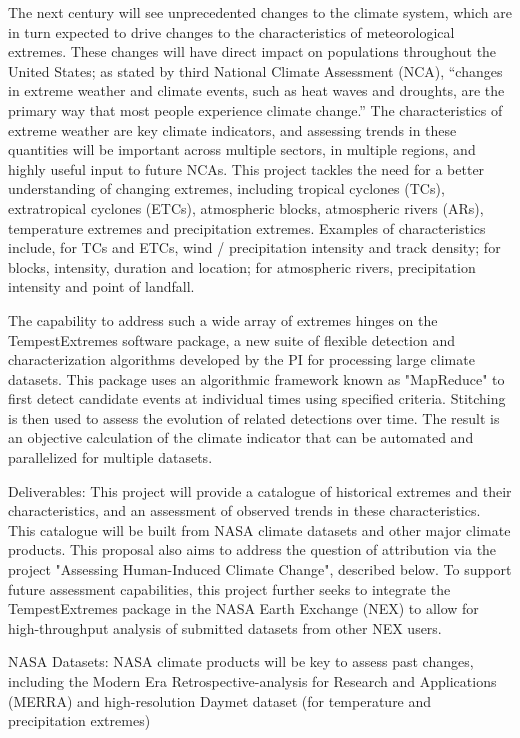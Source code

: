 The next century will see unprecedented changes to the climate system, which are in turn expected to drive changes to the characteristics of meteorological extremes. These changes will have direct impact on populations throughout the United States; as stated by third National Climate Assessment (NCA), ``changes in extreme weather and climate events, such as heat waves and droughts, are the primary way that most people experience climate change.'' The characteristics of extreme weather are key climate indicators, and assessing trends in these quantities will be important across multiple sectors, in multiple regions, and highly useful input to future NCAs. This project tackles the need for a better understanding of changing extremes, including tropical cyclones (TCs), extratropical cyclones (ETCs), atmospheric blocks, atmospheric rivers (ARs), temperature extremes and precipitation extremes. Examples of characteristics include, for TCs and ETCs, wind / precipitation intensity and track density; for blocks, intensity, duration and location; for atmospheric rivers, precipitation intensity and point of landfall.

The capability to address such a wide array of extremes hinges on the TempestExtremes software package, a new suite of flexible detection and characterization algorithms developed by the PI for processing large climate datasets. This package uses an algorithmic framework known as "MapReduce" to first detect candidate events at individual times using specified criteria. Stitching is then used to assess the evolution of related detections over time. The result is an objective calculation of the climate indicator that can be automated and parallelized for multiple datasets.

Deliverables:  This project will provide a catalogue of historical extremes and their characteristics, and an assessment of observed trends in these characteristics. This catalogue will be built from NASA climate datasets and other major climate products. This proposal also aims to address the question of attribution via the project "Assessing Human-Induced Climate Change", described below.  To support future assessment capabilities, this project further seeks to integrate the TempestExtremes package in the NASA Earth Exchange (NEX) to allow for high-throughput analysis of submitted datasets from other NEX users.

NASA Datasets:  NASA climate products will be key to assess past changes, including the Modern Era Retrospective-analysis for Research and Applications (MERRA) and high-resolution Daymet dataset (for temperature and precipitation extremes)

